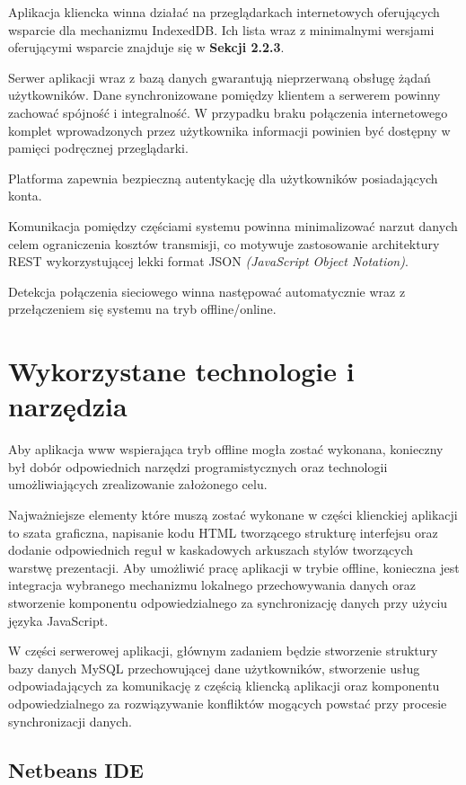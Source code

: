 Aplikacja kliencka winna działać na przeglądarkach internetowych oferujących wsparcie dla mechanizmu IndexedDB. Ich lista wraz z minimalnymi wersjami oferującymi wsparcie znajduje się w \textbf{Sekcji 2.2.3}.

Serwer aplikacji wraz z bazą danych gwarantują nieprzerwaną obsługę żądań użytkowników. Dane synchronizowane pomiędzy klientem a serwerem powinny zachować spójność i integralność. W przypadku braku połączenia internetowego komplet wprowadzonych przez użytkownika informacji powinien być dostępny w pamięci podręcznej przeglądarki.

Platforma zapewnia bezpieczną autentykację dla użytkowników posiadających konta.

Komunikacja pomiędzy częściami systemu powinna minimalizować narzut danych celem ograniczenia kosztów transmisji, co motywuje zastosowanie architektury REST wykorzystującej lekki format JSON \emph{(JavaScript Object Notation)}\cite{json}.

Detekcja połączenia sieciowego winna następować automatycznie wraz z przełączeniem się systemu na tryb offline/online.

\section{Wykorzystane technologie i narzędzia}
\label{sec:wykoTechnINarz}

Aby aplikacja www wspierająca tryb offline mogła zostać wykonana, konieczny był dobór odpowiednich narzędzi programistycznych oraz technologii umożliwiających zrealizowanie założonego celu.

Najważniejsze elementy które muszą zostać wykonane w części klienckiej aplikacji to szata graficzna, napisanie kodu HTML tworzącego strukturę interfejsu oraz dodanie odpowiednich reguł w kaskadowych arkuszach stylów tworzących warstwę prezentacji. Aby umożliwić pracę aplikacji w trybie offline, konieczna jest integracja wybranego mechanizmu lokalnego przechowywania danych oraz stworzenie komponentu odpowiedzialnego za synchronizację danych przy użyciu języka JavaScript.

W części serwerowej aplikacji, głównym zadaniem będzie stworzenie struktury bazy danych \mbox{MySQL} przechowującej dane użytkowników, stworzenie usług odpowiadających za komunikację z częścią kliencką aplikacji oraz komponentu odpowiedzialnego za rozwiązywanie konfliktów mogących powstać przy procesie synchronizacji danych.

\subsection{Netbeans IDE}
\label{sec:netbeans}

